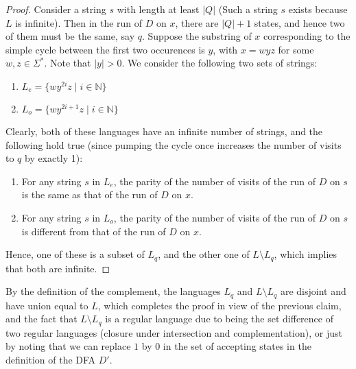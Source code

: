 \begin{soln}
\begin{claim}
    \end{claim}
    \begin{proof}
        Consider a string $s$ with length at least $|Q|$ (Such a string $s$ exists because $L$ is infinite). Then in the run of $D$ on $x$, there are $|Q| + 1$ states, and hence two of them must be the same, say $q$. Suppose the substring of $x$
        corresponding to the simple cycle between the first two occurences is $y$, with $x = wyz$ for some $w, z \in \Sigma^*$. Note that $|y| > 0$. We consider the following two sets of strings:
        \begin{enumerate}
            \item $L_e = \{wy^{2i}z \mid i \in \mathbb{N}\}$
            \item $L_o = \{wy^{2i+1}z \mid i \in \mathbb{N}\}$
        \end{enumerate}
        Clearly, both of these languages have an infinite number of strings, and the following hold true (since pumping the cycle once increases the number of visits to $q$ by exactly 1):
        \begin{enumerate}
            \item For any string $s$ in $L_e$, the parity of the number of visits of the run of $D$ on $s$ is the same as that of the run of $D$ on $x$.
            \item For any string $s$ in $L_o$, the parity of the number of visits of the run of $D$ on $s$ is different from that of the run of $D$ on $x$.
        \end{enumerate}
        Hence, one of these is a subset of $L_q$, and the other one of $L \setminus L_q$, which implies that both are infinite. 
    \end{proof}
    By the definition of the complement, the languages $L_q$ and $L \setminus L_q$ are disjoint and have union equal to $L$, which completes the proof in view of the previous claim, and the fact that
    $L \setminus L_q$ is a regular language due to being the set difference of two regular languages (closure under intersection and complementation), or just by noting that we can replace
    $1$ by $0$ in the set of accepting states in the definition of the DFA $D'$.
\end{soln}
